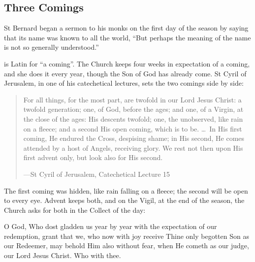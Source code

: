 \subsection{Three Comings}\label{sec:three-comings}

St Bernard began a sermon to his monks on the first day of the season by
saying that its name was known to all the world, ``But perhaps the meaning of
the name is not so generally understood.''

 is Latin for ``a coming''. The Church keeps four weeks in
expectation of a coming, and she does it every year, though the Son of God has
already come. St Cyril of Jerusalem, in one of his catechetical lectures, sets
the two comings side by side:

\begin{quote}
For all things, for the most part, are twofold in our Lord Jesus Christ: a
twofold generation; one, of God, before the ages; and one, of a Virgin, at the
close of the ages: His descents twofold; one, the unobserved, like rain on a
fleece; and a second His open coming, which is to be. \dots\ In His first
coming, He endured the Cross, despising shame; in His second, He comes attended
by a host of Angels, receiving glory. We rest not then upon His first advent
only, but look also for His second.\par
{\smallskip\noindent\small ---St Cyril of Jerusalem, Catechetical Lecture 15\par}
\end{quote}

The first coming was hidden, like rain falling on a fleece; the second will be
open to every eye. Advent keeps both, and on the Vigil, at the end of the
season, the Church asks for both in the Collect of the day:

\begin{studyframe}
\medskip

O God, Who dost gladden us year by year with the expectation of our
redemption, grant that we, who now with joy receive Thine only begotten Son as
our Redeemer, may behold Him also without fear, when He cometh as our judge,
our Lord Jesus Christ. Who with thee.\par
\end{studyframe}

